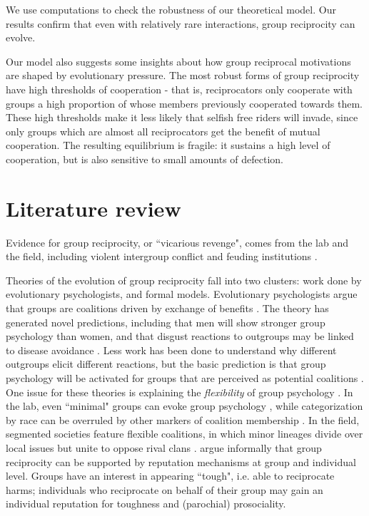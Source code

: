 \documentclass[12pt,a4paper]{article}
\begin{document}
We use computations to check the robustness of our theoretical model. Our results confirm that even with relatively rare interactions, group reciprocity can evolve.

Our model also suggests some insights about how group reciprocal motivations are shaped by evolutionary pressure. The most robust forms of group reciprocity have high thresholds of cooperation - that is, reciprocators only cooperate with groups a high proportion of whose members previously cooperated towards them. These high thresholds make it less likely that selfish free riders will invade, since only groups which are almost all reciprocators get the benefit of mutual cooperation. The resulting equilibrium is fragile: it sustains a high level of cooperation, but is also sensitive to small amounts of defection.


\section{Literature review}

Evidence for group reciprocity, or ``vicarious revenge", comes from the lab 
\parencite{lickel_vicarious_2006,gaertner2008whenrejection,stenstrom_roles_2008,hugh2017intergroup,hugh2019humans,romano2022direct}
and the field, including violent intergroup conflict \parencite{haushofer_both_2010}
and feuding institutions \parencite{boehm1984blood,chagnon1988lifehistories}. 

Theories of the evolution of group reciprocity fall into two clusters:
work done by evolutionary psychologists, and formal models.
Evolutionary psychologists argue that groups are coalitions driven by exchange of benefits \parencite{tooby2010groups,kurzban2015managing}. The theory has generated novel predictions, including that men will show stronger group psychology than women, and that disgust reactions to outgroups may be linked to disease avoidance \parencite{van2009guns}. Less work has been done to understand why different outgroups elicit different reactions, but the basic prediction is that group psychology will be activated for groups that are perceived as potential coalitions \parencite{kurzban2001can}. One issue for these theories is
explaining the \emph{flexibility} of group psychology \parencite{dunham2018mere}. In the lab, even
``minimal" groups can evoke group psychology \parencite{tajfel1971social}, while 
categorization by race can be overruled by other markers of coalition membership 
\parencite{kurzban2001can}. In the field, segmented societies feature flexible coalitions, 
in which minor lineages divide over local issues but unite to oppose rival clans 
\parencite{fortes2015african}. \textcite{columbus2023parochial} argue informally that group 
reciprocity can be supported by reputation mechanisms at group and individual level. Groups
have an interest in appearing ``tough", i.e. able to reciprocate harms; individuals
who reciprocate on behalf of their group may gain an individual reputation for
toughness and (parochial) prosociality. 
\end{document}
